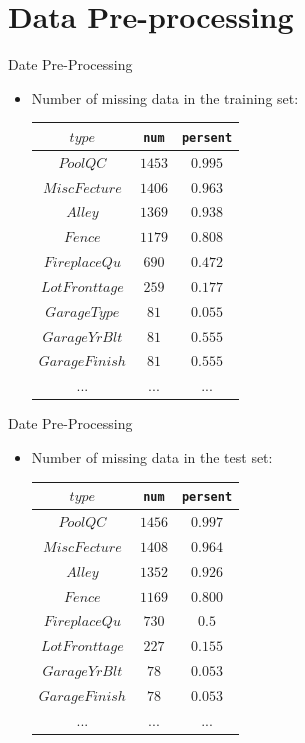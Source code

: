 \documentclass[
size=14pt,
paper=smartboard,  %
mode=present, 		%
display=slides, 	%
style=tuliplab,  	%
pauseslide,
fleqn,leqno]{powerdot}
\begin{document}
	\section{Data Pre-processing}
	\begin{slide}[toc=,bm=]{Date Pre-Processing}
		\begin{itemize}
		\item Number of missing data in the training set:
		\begin{center}
			\begin{tabular}{c c c }
				\toprule
				$type$ & \texttt{num}  & \texttt{persent} \\
				\midrule
				$PoolQC$ &  {$1453$} &  {$0.995$}   \\
				$MiscFecture$ &  {$1406$} &  {$0.963$}   \\
				$Alley$ &  {$1369$} &  {$0.938$}   \\
				$Fence$ &  {$1179$} &  {$0.808$}   \\
				$FireplaceQu$ &  {$690$} &  {$0.472$}   \\
				$LotFronttage$ &  {$259$} &  {$0.177$}   \\
				$GarageType$ &  {$81$} &  {$0.055$}   \\
				$GarageYrBlt$ &  {$81$} &  {$0.555$}   \\
				$GarageFinish$ &  {$81$} &  {$0.555$}   \\
				 {$...$} &  {$...$}  &  {$...$}\\
				\bottomrule
			\end{tabular}
		\end{center}
		\end{itemize}
	\end{slide}
	\begin{slide}[toc=,bm=]{Date Pre-Processing}
		\begin{itemize}
			\item Number of missing data in the test set:
			\begin{center}
				\begin{tabular}{c c c }
					\toprule
					$type$ & \texttt{num}  & \texttt{persent} \\
					\midrule
					$PoolQC$ &  {$1456$} &  {$0.997$}   \\
					$MiscFecture$ &  {$1408$} &  {$0.964$}   \\
					$Alley$ &  {$1352$} &  {$0.926$}   \\
					$Fence$ &  {$1169$} &  {$0.800$}   \\
					$FireplaceQu$ &  {$730$} &  {$0.5$}   \\
					$LotFronttage$ &  {$227$} &  {$0.155$}   \\
					$GarageYrBlt$ &  {$78$} &  {$0.053$}   \\
					$GarageFinish$ &  {$78$} &  {$0.053$}   \\
					{$...$} &  {$...$}  &  {$...$}\\
					\bottomrule
				\end{tabular}
			\end{center}
		\end{itemize}
	\end{slide}
\end{document}
